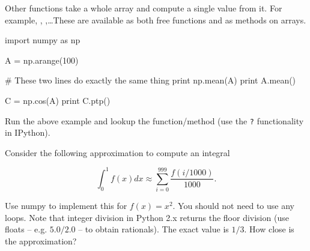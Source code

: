 Other functions take a whole array and compute a single value from it. For example, , ,\ldots These are available as both free functions and as methods on arrays.

\begin{python}
import numpy as np

A = np.arange(100)

# These two lines do exactly the same thing
print np.mean(A)
print A.mean()

C = np.cos(A)
print C.ptp()
\end{python}

\begin{exercise}
Run the above example and lookup the  function/method (use the \texttt{?} functionality in IPython).
\end{exercise}


\begin{exercise}
Consider the following approximation to compute an integral

\[
\int_0^{1} f(x)dx \approx \sum_{i = 0}^{999} \frac{f(i/1000)}{1000}.
\]

Use numpy to implement this for $f(x) = x^2$. You should not need to use any loops. Note that integer division in Python 2.x returns the floor division (use floats -- e.g. $5.0/2.0$ -- to obtain rationals). The exact value is $1/3$. How close is the approximation?
\end{exercise}



